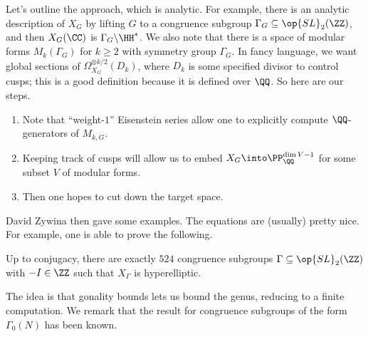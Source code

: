 \documentclass{article}
\begin{document}
Let's outline the approach, which is analytic. For example, there is an analytic description of $X_G$ by lifting $G$ to a congruence subgroup $\Gamma_G\subseteq\op{SL}_2(\ZZ)$, and then $X_G(\CC)$ is $\Gamma_G\backslash\HH^*$. We also note that there is a space of modular forms $M_k(\Gamma_G)$ for $k\ge2$ with symmetry group $\Gamma_G$. In fancy language, we want global sections of $\Omega_{X_G}^{\otimes k/2}(D_k)$, where $D_k$ is some specified divisor to control cusps; this is a good definition because it is defined over $\QQ$. So here are our steps.
\begin{enumerate}
	\item Note that ``weight-$1$'' Eisenstein series allow one to explicitly compute $\QQ$-generators of $M_{k,G}$.
	\item Keeping track of cusps will allow us to embed $X_G\into\PP_\QQ^{\dim V-1}$ for some subset $V$ of modular forms.
	\item Then one hopes to cut down the target space.
\end{enumerate}
David Zywina then gave some examples. The equations are (usually) pretty nice. For example, one is able to prove the following.
\begin{theorem}
	Up to conjugacy, there are exactly $524$ congruence subgroups $\Gamma\subseteq\op{SL}_2(\ZZ)$ with $-I\in\ZZ$ such that $X_\Gamma$ is hyperelliptic.
\end{theorem}
The idea is that gonality bounds lets us bound the genus, reducing to a finite computation. We remark that the result for congruence subgroups of the form $\Gamma_0(N)$ has been known.
\end{document}
